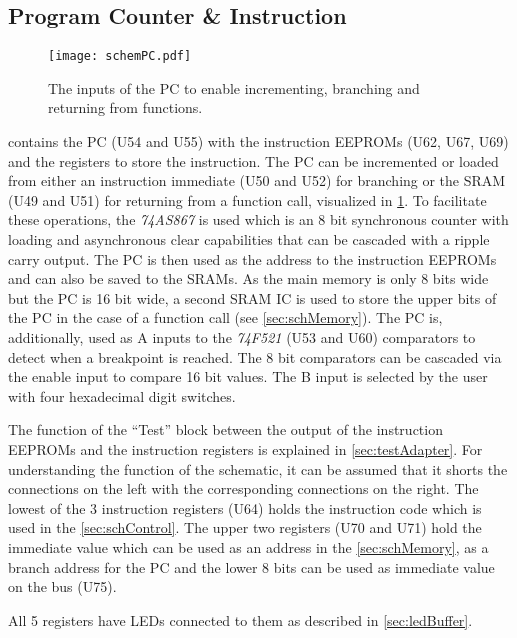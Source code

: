 \subsection{Program Counter \& Instruction }
\begin{figure}[t]
  \centering
  \texttt{[image: schemPC.pdf]}
  \caption{The inputs of the \gls{PC} to enable incrementing, branching and returning from functions.}
  \label{fig:schemPC}
\end{figure}
 contains the \gls{PC} (U54 and U55) with the instruction \glspl{EEPROM} (U62, U67, U69) and the registers to store the instruction.
The \gls{PC} can be incremented or loaded from either an instruction immediate (U50 and U52) for branching or the \gls{SRAM} (U49 and U51) for returning from a function call, visualized in \cref{fig:schemPC}.
To facilitate these operations, the \emph{74AS867} is used which is an 8 bit synchronous counter with loading and asynchronous clear capabilities that can be cascaded with a ripple carry output.
The \gls{PC} is then used as the address to the instruction \glspl{EEPROM} and can also be saved to the \glspl{SRAM}.
As the main memory is only 8 bits wide but the \gls{PC} is 16 bit wide, a second \gls{SRAM} \gls{IC} is used to store the upper bits of the \gls{PC} in the case of a function call (see \cref{sec:schMemory}).
The \gls{PC} is, additionally, used as A inputs to the \emph{74F521} (U53 and U60) comparators to detect when a breakpoint is reached.
The 8 bit comparators can be cascaded via the enable input to compare 16 bit values.
The B input is selected by the user with four hexadecimal digit switches.

The function of the ``Test'' block between the output of the instruction \glspl{EEPROM} and the instruction registers is explained in \cref{sec:testAdapter}.
For understanding the function of the schematic, it can be assumed that it shorts the connections on the left with the corresponding connections on the right.
The lowest of the 3 instruction registers (U64) holds the instruction code which is used in the \cref{sec:schControl}.
The upper two registers (U70 and U71) hold the immediate value which can be used as an address in the \cref{sec:schMemory}, as a branch address for the \gls{PC} and the lower 8 bits can be used as immediate value on the bus (U75).

All 5 registers have \glspl{LED} connected to them as described in \cref{sec:ledBuffer}.

